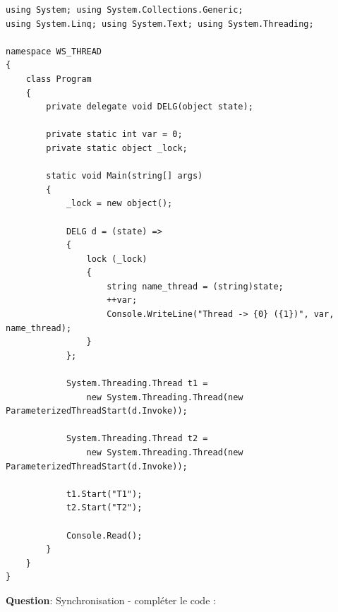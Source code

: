 \begin{verbatim}
using System; using System.Collections.Generic;
using System.Linq; using System.Text; using System.Threading;

namespace WS_THREAD
{
    class Program
    {
        private delegate void DELG(object state);

        private static int var = 0;
        private static object _lock;

        static void Main(string[] args)
        {
            _lock = new object();

            DELG d = (state) =>
            {
                lock (_lock)
                {
                    string name_thread = (string)state;
                    ++var;
                    Console.WriteLine("Thread -> {0} ({1})", var, name_thread);
                }
            };

            System.Threading.Thread t1 =
                new System.Threading.Thread(new ParameterizedThreadStart(d.Invoke));

            System.Threading.Thread t2 =
                new System.Threading.Thread(new ParameterizedThreadStart(d.Invoke));

            t1.Start("T1");
            t2.Start("T2");

            Console.Read();
        }
    }
}
\end{verbatim}

\newpage

\noindent \textbf{Question}: Synchronisation - compléter le code :


